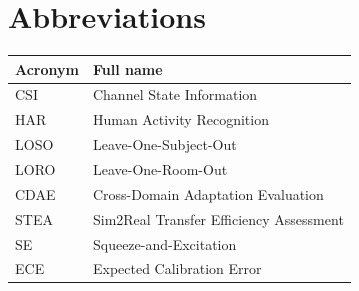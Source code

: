 \documentclass[journal]{IEEEtran}
\begin{document}
\section*{Abbreviations}
\begin{table}[h]
\centering
\begin{tabular}{@{}ll@{}}
\toprule
\textbf{Acronym} & \textbf{Full name} \\
\midrule
CSI & Channel State Information \\
HAR & Human Activity Recognition \\
LOSO & Leave-One-Subject-Out \\
LORO & Leave-One-Room-Out \\
CDAE & Cross-Domain Adaptation Evaluation \\
STEA & Sim2Real Transfer Efficiency Assessment \\
SE & Squeeze-and-Excitation \\
ECE & Expected Calibration Error \\
\bottomrule
\end{tabular}
\end{table}



\end{document}
